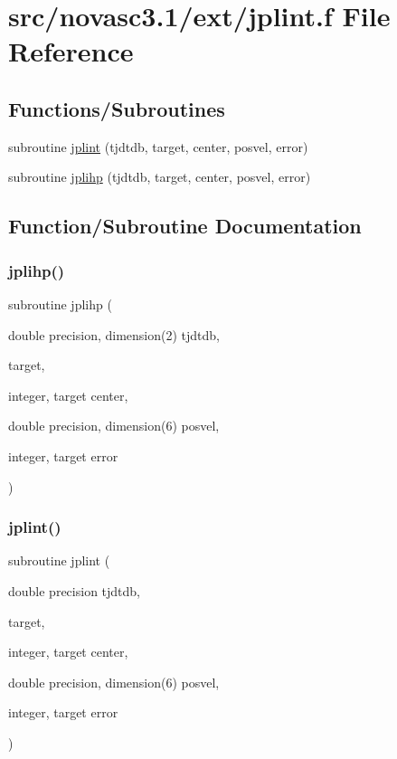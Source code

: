 \hypertarget{jplint_8f}{}\section{src/novasc3.1/ext/jplint.f File Reference}
\label{jplint_8f}
\subsection*{Functions/\+Subroutines}
\begin{DoxyCompactItemize}
\item 
subroutine \mbox{\hyperlink{jplint_8f_ae84648140de527e802566afa2d9578fa}{jplint}} (tjdtdb, target, center, posvel, error)
\item 
subroutine \mbox{\hyperlink{jplint_8f_a51df8d24f24c10486ad79c7b1fb8e198}{jplihp}} (tjdtdb, target, center, posvel, error)
\end{DoxyCompactItemize}


\subsection{Function/\+Subroutine Documentation}
\mbox{\label{jplint_8f_a51df8d24f24c10486ad79c7b1fb8e198}} 
\subsubsection{\texorpdfstring{jplihp()}{jplihp()}}
{\footnotesize\ttfamily subroutine jplihp (\begin{DoxyParamCaption}\item[{double precision, dimension(2)}]{tjdtdb,  }\item[{}]{target,  }\item[{integer, target}]{center,  }\item[{double precision, dimension(6)}]{posvel,  }\item[{integer, target}]{error }\end{DoxyParamCaption})}

\mbox{\label{jplint_8f_ae84648140de527e802566afa2d9578fa}} 
\subsubsection{\texorpdfstring{jplint()}{jplint()}}
{\footnotesize\ttfamily subroutine jplint (\begin{DoxyParamCaption}\item[{double precision}]{tjdtdb,  }\item[{}]{target,  }\item[{integer, target}]{center,  }\item[{double precision, dimension(6)}]{posvel,  }\item[{integer, target}]{error }\end{DoxyParamCaption})}

